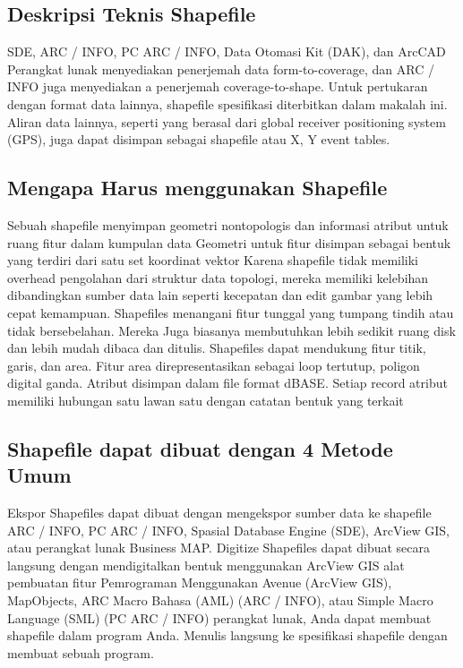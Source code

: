 \subsection{Deskripsi Teknis Shapefile}
SDE, ARC / INFO, PC ARC / INFO, Data Otomasi Kit (DAK), dan ArcCAD
Perangkat lunak menyediakan penerjemah data form-to-coverage, dan ARC / INFO juga menyediakan a 
penerjemah coverage-to-shape. Untuk pertukaran dengan format data lainnya, shapefile 
spesifikasi diterbitkan dalam makalah ini. Aliran data lainnya, seperti yang berasal dari global 
receiver positioning system (GPS), juga dapat disimpan sebagai shapefile atau X, Y event tables. 

\subsection{Mengapa Harus menggunakan Shapefile}
Sebuah shapefile menyimpan geometri nontopologis dan informasi atribut untuk ruang 
fitur dalam kumpulan data Geometri untuk fitur disimpan sebagai bentuk yang terdiri dari satu set 
koordinat vektor 
Karena shapefile tidak memiliki overhead pengolahan dari struktur data topologi, 
mereka memiliki kelebihan dibandingkan sumber data lain seperti kecepatan dan edit gambar yang lebih cepat 
kemampuan. Shapefiles menangani fitur tunggal yang tumpang tindih atau tidak bersebelahan. Mereka 
Juga biasanya membutuhkan lebih sedikit ruang disk dan lebih mudah dibaca dan ditulis. 
Shapefiles dapat mendukung fitur titik, garis, dan area. Fitur area direpresentasikan sebagai 
loop tertutup, poligon digital ganda. Atribut disimpan dalam file format dBASE. 
Setiap record atribut memiliki hubungan satu lawan satu dengan catatan bentuk yang terkait

\subsection{Shapefile dapat dibuat dengan 4 Metode Umum}
Ekspor Shapefiles dapat dibuat dengan mengekspor sumber data ke shapefile
ARC / INFO, PC ARC / INFO, Spasial Database Engine (SDE), ArcView GIS,
atau perangkat lunak Business MAP.
Digitize Shapefiles dapat dibuat secara langsung dengan mendigitalkan bentuk menggunakan ArcView GIS
alat pembuatan fitur
Pemrograman Menggunakan Avenue (ArcView GIS), MapObjects, ARC Macro
Bahasa (AML) (ARC / INFO), atau Simple Macro Language (SML)
(PC ARC / INFO) perangkat lunak, Anda dapat membuat shapefile dalam program Anda.
Menulis langsung ke spesifikasi shapefile dengan membuat sebuah program. 

